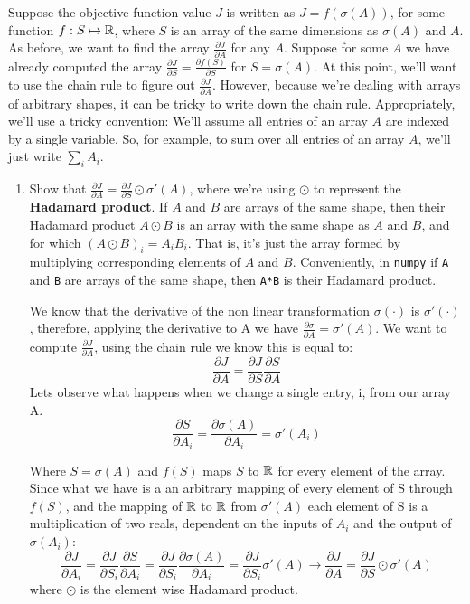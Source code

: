 \documentclass{article}
\theoremstyle{plain}
\theoremstyle{definition}
\begin{document}
Suppose the objective function value $J$ is written as $J=f(\sigma(A))$,
for some function $f:S\mapsto\mathbb{R}$, where $S$ is an array of the
same dimensions as $\sigma(A)$ and $A$. As before, we want to find
the array $\frac{\partial J}{\partial A}$ for any $A$. Suppose for
some $A$ we have already computed the array $\frac{\partial J}{\partial S}=\frac{\partial f(S)}{\partial S}$
for $S=\sigma(A)$. At this point, we'll want to use the chain rule
to figure out $\frac{\partial J}{\partial A}$. However, because we're
dealing with arrays of arbitrary shapes, it can be tricky to write
down the chain rule. Appropriately, we'll use a tricky convention:
We'll assume all entries of an array $A$ are indexed by a single
variable. So, for example, to sum over all entries of an array $A$,
we'll just write $\sum_{i}A_{i}$. 
\begin{enumerate}
\setcounter{enumi}{\value{saveenum}}
\item Show that $\frac{\partial J}{\partial A}=\frac{\partial J}{\partial S}\odot\sigma'(A)$,
where we're using $\odot$ to represent the \textbf{Hadamard product}.
If $A$ and $B$ are arrays of the same shape, then their Hadamard
product $A\odot B$ is an array with the same shape as $A$ and $B$,
and for which $\left(A\odot B\right)_{i}=A_{i}B_{i}$. That is, it's
just the array formed by multiplying corresponding elements of $A$
and $B$. Conveniently, in \texttt{numpy} if \texttt{A} and \texttt{B}
are arrays of the same shape, then \texttt{A{*}B} is their Hadamard
product.

\subitem

We know that the derivative of the non linear transformation $\sigma(\cdot)$ is $\sigma'(\cdot)$, therefore, applying the derivative to A we have $\frac{\partial \sigma}{\partial A} = \sigma'(A)$.
We want to compute $\frac{\partial J}{\partial A}$, using the chain rule we know this is equal to:
$$
\frac{\partial J}{\partial A} = \frac{\partial J}{\partial S} \frac{\partial S}{\partial A} 
$$
Lets observe what happens when we change a single entry, i, from our array A.
$$
    \frac{\partial S}{\partial A_i} = \frac{\partial \sigma(A)}{\partial A_i} = \sigma'(A_i)
$$

Where $S=\sigma(A)$ and $f(S)$ maps $S$ to $\mathbb{R}$ for every element of the array. Since what we have is a an arbitrary mapping of every element of S through $f(S)$, and the mapping of $\mathbb{R}$ to $\mathbb{R}$ from $\sigma'(A)$ each element of S is a multiplication of two reals, dependent on the inputs of $A_i$ and the output of $\sigma(A_i)$:
$$
    \frac{\partial J}{\partial A_i}=
    \frac{\partial J}{\partial S_i}\frac{\partial S}{\partial A_i} 
    = \frac{\partial J}{\partial S_i}\frac{\partial \sigma(A)}{\partial A_i} 
    = \frac{\partial J}{\partial S_i}\sigma'(A)
    \rightarrow \frac{\partial J}{\partial A}=\frac{\partial J}{\partial S} \odot\sigma'(A)
$$
where $\odot$ is the element wise Hadamard product.

\setcounter{saveenum}{\value{enumi}}
\end{enumerate}
\end{document}
